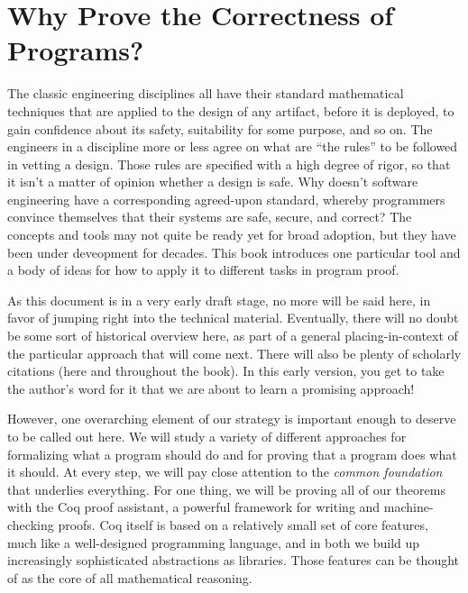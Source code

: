 \documentclass{amsbook}
\theoremstyle{definition}
\theoremstyle{remark}
\numberwithin{section}{chapter}
\numberwithin{equation}{chapter}
\begin{document}
\newpage

\setcounter{page}{4}

\tableofcontents

\mainmatter


\chapter{Why Prove the Correctness of Programs?}

The classic engineering disciplines all have their standard mathematical techniques that are applied to the design of any artifact, before it is deployed, to gain confidence about its safety, suitability for some purpose, and so on.
The engineers in a discipline more or less agree on what are ``the rules'' to be followed in vetting a design.
Those rules are specified with a high degree of rigor, so that it isn't a matter of opinion whether a design is safe.
Why doesn't software engineering have a corresponding agreed-upon standard, whereby programmers convince themselves that their systems are safe, secure, and correct?
The concepts and tools may not quite be ready yet for broad adoption, but they have been under deveopment for decades.
This book introduces one particular tool and a body of ideas for how to apply it to different tasks in program proof.

As this document is in a very early draft stage, no more will be said here, in favor of jumping right into the technical material.
Eventually, there will no doubt be some sort of historical overview here, as part of a general placing-in-context of the particular approach that will come next.
There will also be plenty of scholarly citations (here and throughout the book).
In this early version, you get to take the author's word for it that we are about to learn a promising approach!

However, one overarching element of our strategy is important enough to deserve to be called out here.
We will study a variety of different approaches for formalizing what a program should do and for proving that a program does what it should.
At every step, we will pay close attention to the \emph{common foundation} that underlies everything.
For one thing, we will be proving all of our theorems with the Coq proof assistant, a powerful framework for writing and machine-checking proofs.
Coq itself is based on a relatively small set of core features, much like a well-designed programming language, and in both we build up increasingly sophisticated abstractions as libraries.
Those features can be thought of as the core of all mathematical reasoning.
\end{document}
